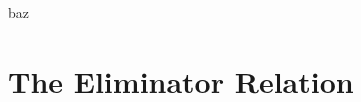 \begin{defn}
\begin{example}
baz
\end{example}

\section{The Eliminator Relation}

\end{defn}












